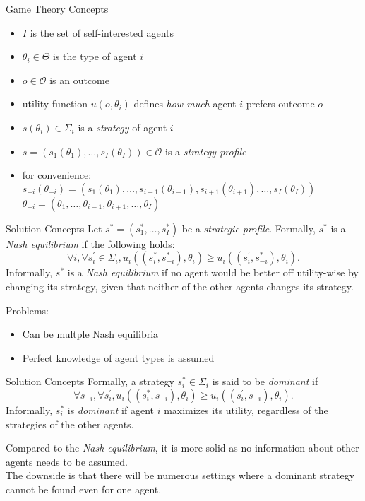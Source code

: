 \documentclass{beamer}
\begin{document}
\begin{frame}{Game Theory Concepts}
\begin{itemize}
    \pause
    \item $I$ is the set of self-interested agents\pause
    \item $\theta_i \in \Theta$ is the type of agent $i$\pause
    \item $o \in \mathcal{O}$ is an outcome\pause
    \item utility function $u(o, \theta_i)$ defines \emph{how much} agent $i$ prefers outcome $o$\pause
    \item $s(\theta_i) \in \Sigma_i$ is a \emph{strategy} of agent $i$\pause
    \item $s=(s_1(\theta_1),\dots,s_I(\theta_I)) \in \mathcal{O}$ is a \emph{strategy profile}\pause
    \item for convenience:
        $s_{-i}(\theta_{-i}) = (s_1(\theta_1),\dots,s_{i-1}(\theta_{i-1}), s_{i+1}(\theta_{i+1}),\dots,s_I(\theta_I))$
        $\theta_{-i}=(\theta_1,\dots,\theta_{i-1},\theta_{i+1},\dots,\theta_I)$
\end{itemize}
\end{frame}

\begin{frame}{Solution Concepts}
    \pause
    Let $s^*=(s_1^*,\dots,s_I^*)$ be a \emph{strategic profile}. Formally,
    $s^*$ is a \emph{Nash equilibrium} if the following holds:
    $$\forall i, \forall s_i^{'} \in \Sigma_i, u_i((s_i^*, s_{-i}^*), \theta_i)
    \geq u_i((s_i^{'},s_{-i}^*), \theta_i).$$\pause
    Informally, $s^*$ is a \emph{Nash equilibrium} if no agent 
    would be better off utility-wise by changing its strategy, 
    given that neither of the other agents changes its strategy.\pause

    \vspace{5mm}
    Problems: \pause
    \begin{itemize}
        \item Can be multple Nash equilibria\pause
        \item Perfect knowledge of agent types is assumed
    \end{itemize}
\end{frame}

\begin{frame}{Solution Concepts}
    \pause
    Formally, a strategy $s_i^* \in \Sigma_i$ is said to be \emph{dominant} if
    $$\forall s_{-i}, \forall s_i^{'}, u_i((s_i^*, s_{-i}),\theta_i)
    \ge u_i((s_i^{'}, s_{-i}),\theta_i).$$\pause
    Informally, $s_i^*$ is \emph{dominant} if agent $i$ maximizes
    its utility, regardless of the strategies of the other agents.\pause

    \vspace{5mm}

    Compared to the \emph{Nash equilibrium}, it is more solid as no information
    about other agents needs to be assumed.\\
    \vspace{3mm}\pause
    The downside is that there will
    be numerous settings where a dominant strategy cannot be found even for
    one agent.
\end{frame}
\end{document}
